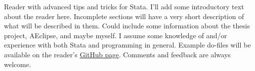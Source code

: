 Reader with advanced tips and tricks for Stata.
I'll add some introductory text about the reader here.
Incomplete sections will have a very short description of what will be described in them.
Could include some information about the thesis project, AEclipse, and maybe myself.
I assume some knowledge of and/or experience with both Stata and programming in general.
Example do-files will be available on the reader's \href{https://github.com/Ahvns/ETPreader}{GitHub page}.
Comments and feedback are always welcome.
